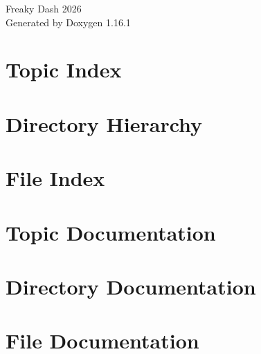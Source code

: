\documentclass[twoside]{book}
\newcommand{\+}{\discretionary{\mbox{\scriptsize$\hookleftarrow$}}{}{}}
\newcommand{\clearemptydoublepage}{%
    \newpage{\pagestyle{empty}\cleardoublepage}%
  }
\begin{document}
  \raggedbottom
    \hypersetup{pageanchor=false,
                bookmarksnumbered=true,
                pdfencoding=unicode
               }
  \begin{titlepage}
  \vspace*{7cm}
  \begin{center}%
  {\Large Freaky Dash 2026}\\
  \vspace*{1cm}
  {\large Generated by Doxygen 1.16.1}\\
  \end{center}
  \end{titlepage}
  \clearemptydoublepage
  \tableofcontents
  \clearemptydoublepage
  \hypersetup{pageanchor=true}
\chapter{Topic Index}

\chapter{Directory Hierarchy}

\chapter{File Index}

\chapter{Topic Documentation}

\chapter{Directory Documentation}



\chapter{File Documentation}





















  \backmatter
  \newpage
  \clearemptydoublepage
  \printindex
\end{document}

